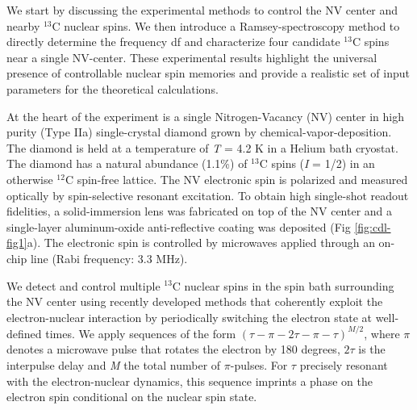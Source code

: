 We start by discussing the experimental methods to control the NV center and nearby $^{13}$C  nuclear spins. We then introduce a Ramsey-spectroscopy method to directly determine the frequency df and characterize four candidate $^{13}$C  spins near a single NV-center. These experimental results highlight the universal presence of controllable nuclear spin memories and provide a realistic set of input parameters for the theoretical calculations.

At the heart of the experiment is a single Nitrogen-Vacancy (NV) center in high purity (Type IIa) single-crystal diamond grown by chemical-vapor-deposition. The diamond is held at a temperature of \textit{T} = 4.2 K in a Helium bath cryostat. The diamond has a natural abundance (1.1\%) of $^{13}$C spins (\textit{I} = 1/2) in an otherwise $^{12}$C spin-free lattice. The NV electronic spin is polarized and measured optically by spin-selective resonant excitation\cite{Togan_Nature_2010,Tamarat_NewJ.Phys._2008,Robledo_Nature_2011}. To obtain high single-shot readout fidelities, a solid-immersion lens was fabricated on top of the NV center and a single-layer aluminum-oxide anti-reflective coating was deposited\cite{Pfaff_Science_2014} (Fig \ref{fig:cdl-fig1}a). The electronic spin is controlled by microwaves applied through an on-chip line (Rabi frequency: 3.3 MHz).     

We detect and control multiple $^{13}$C nuclear spins in the spin bath surrounding the NV center using recently developed methods that coherently exploit the electron-nuclear interaction by periodically switching the electron state at well-defined times\cite{Taminiau_Phys.Rev.Lett._2012,Kolkowitz_Phys.Rev.Lett._2012,Zhao_NatNano_2012,Taminiau_NatNano_2014}. We apply sequences of the form $(\tau - \pi - 2\tau - \pi - \tau)^{M/2}$, where $\pi$ denotes a microwave pulse that rotates the electron by 180 degrees, $2\tau$ is the interpulse delay and \textit{M} the total number of $\pi$-pulses. For $\tau$ precisely resonant with the electron-nuclear dynamics, this sequence imprints a phase on the electron spin conditional on the nuclear spin state. 

